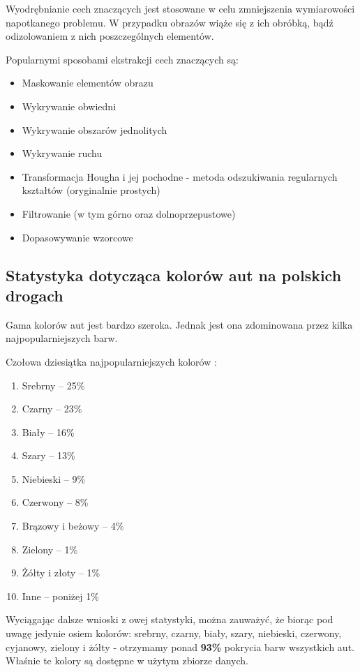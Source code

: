 Wyodrębnianie cech znaczących jest stosowane w celu zmniejszenia wymiarowości napotkanego problemu. W przypadku obrazów wiąże się z ich obróbką, bądź odizolowaniem z nich poszczególnych elementów.

Popularnymi sposobami ekstrakcji cech znaczących są:

\begin{itemize}
    \item Maskowanie elementów obrazu
    \item Wykrywanie obwiedni
    \item Wykrywanie obszarów jednolitych 
    \item Wykrywanie ruchu
    \item Transformacja Hougha i jej pochodne - metoda odszukiwania regularnych kształtów (oryginalnie prostych)
    \item Filtrowanie (w tym górno oraz dolnoprzepustowe)
    \item Dopasowywanie wzorcowe
\end{itemize}


\subsection{Statystyka dotycząca kolorów aut na polskich drogach}

Gama kolorów aut jest bardzo szeroka. Jednak jest ona zdominowana przez kilka najpopularniejszych barw.

Czołowa dziesiątka najpopularniejszych kolorów \cite{autocentrum}:
\begin{enumerate}
    
    \item Srebrny – 25\%
    \item Czarny – 23\%
    \item Biały – 16\%
    \item Szary – 13\%
    \item Niebieski – 9\%
    \item Czerwony – 8\%
    \item Brązowy i beżowy – 4\%
    \item Zielony – 1\%
    \item Żółty i złoty – 1\%
    \item Inne – poniżej 1\% 
\end{enumerate}

Wyciągając dalsze wnioski z owej statystyki, można zauważyć, że biorąc pod uwagę jedynie osiem kolorów: srebrny, czarny, biały, szary, niebieski, czerwony, cyjanowy, zielony i żółty - otrzymamy ponad \textbf{93\%} pokrycia barw wszystkich aut. Właśnie te kolory są dostępne w użytym zbiorze danych.

